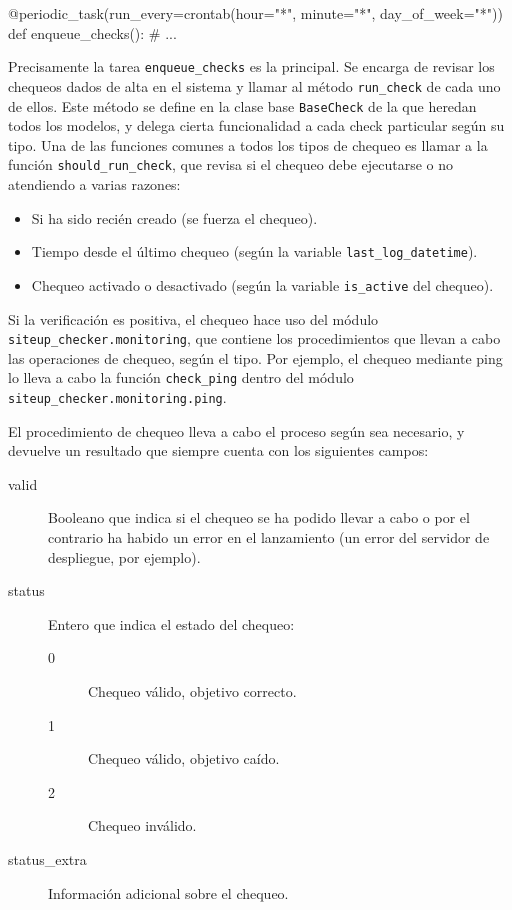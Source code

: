 \begin{pythoncode}
@periodic_task(run_every=crontab(hour="*", minute="*", day_of_week="*"))
def enqueue_checks():
    # ...  
\end{pythoncode}

Precisamente la tarea \texttt{enqueue\_checks} es la principal. Se encarga de
revisar los chequeos dados de alta en el sistema y llamar al método
\texttt{run\_check} de cada uno de ellos. Este método se define en la clase base
\texttt{BaseCheck} de la que heredan todos los modelos, y delega cierta
funcionalidad a cada check particular según su tipo. Una de las funciones
comunes a todos los tipos de chequeo es llamar a la función
\texttt{should\_run\_check}, que revisa si el chequeo debe ejecutarse o no
atendiendo a varias razones:

\begin{itemize}
\item Si ha sido recién creado (se fuerza el chequeo).
\item Tiempo desde el último chequeo (según la variable
  \texttt{last\_log\_datetime}).
\item Chequeo activado o desactivado (según la variable \texttt{is\_active} del
  chequeo).
\end{itemize}

Si la verificación es positiva, el chequeo hace uso del módulo
\texttt{siteup\_checker.monitoring}, que contiene los procedimientos que llevan
a cabo las operaciones de chequeo, según el tipo. Por ejemplo, el chequeo
mediante ping lo lleva a cabo la función \texttt{check\_ping} dentro del módulo
\texttt{siteup\_checker.monitoring.ping}.

El procedimiento de chequeo lleva a cabo el proceso según sea necesario, y
devuelve un resultado que siempre cuenta con los siguientes campos:

\begin{description}
\item[valid] Booleano que indica si el chequeo se ha podido llevar a cabo o por
  el contrario ha habido un error en el lanzamiento (un error del servidor de
  despliegue, por ejemplo).
\item[status] Entero que indica el estado del chequeo:
  \begin{description}
  \item[0] Chequeo válido, objetivo correcto.
  \item[1] Chequeo válido, objetivo caído.
  \item[2] Chequeo inválido.
  \end{description}
\item[status\_extra] Información adicional sobre el chequeo.
\end{description}

